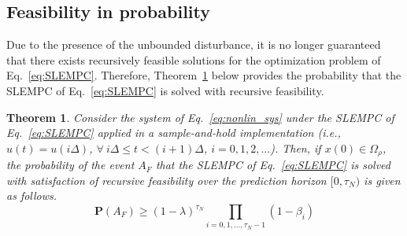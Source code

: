 \documentclass[letterpaper, 10pt, conference]{ieeeconf}
\newtheorem{thm}{Theorem}
\begin{document}


\subsection{Feasibility in probability}
Due to the presence of the unbounded disturbance, it is no longer guaranteed that there exists recursively feasible solutions for the optimization problem of Eq.~\ref{eq:SLEMPC}. Therefore, Theorem~\ref{thm5} below provides the probability that the SLEMPC of Eq.~\ref{eq:SLEMPC} is solved with recursive feasibility. 
\begin{thm}\label{thm5}
	Consider the system of Eq.~\ref{eq:nonlin_sys} under the SLEMPC of Eq.~\ref{eq:SLEMPC} applied in a sample-and-hold implementation (i.e., $u(t)=u(i\Delta)$, $\forall ~i \Delta \leq t < (i+1) \Delta$, $i=0,1,2,...$). Then, if $x(0) \in \Omega_{\rho}$, the probability of the event $A_F$ that the SLEMPC of Eq.~\ref{eq:SLEMPC} is solved with satisfaction of recursive feasibility over the prediction horizon $[0,\tau_{N})$ is given as follows.
	\begin{equation}
	\mathbf{P}(A_F) \geq (1- \lambda)^{\tau_{N}} \prod \limits_{i=0,1,...,\tau_{N}-1} (1-\beta_i)
	\end{equation}
\end{thm}

\hspace{0.5cm}
\end{document}
